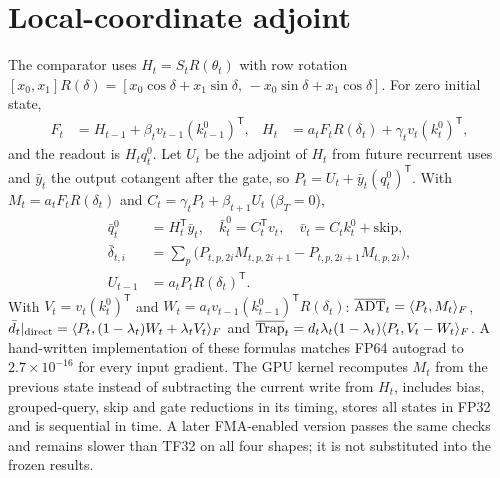 \appendices
\section{Local-coordinate adjoint}\label{app:local}
The comparator uses $H_t=S_tR(\theta_t)$ with row rotation $[x_0,x_1]R(\delta)=[x_0\cos\delta+x_1\sin\delta,\,-x_0\sin\delta+x_1\cos\delta]$. For zero initial state,
\begin{align}
F_t&=H_{t-1}+\beta_t v_{t-1}(k_{t-1}^{0})^{\mathsf T}, &
H_t&=a_tF_tR(\delta_t)+\gamma_t v_t(k_t^0)^{\mathsf T},\label{eq:local}
\end{align}
and the readout is $H_tq_t^0$. Let $U_t$ be the adjoint of $H_t$ from future recurrent uses and $\bar y_t$ the output cotangent after the gate, so $P_t=U_t+\bar y_t(q_t^0)^{\mathsf T}$. With $M_t=a_tF_tR(\delta_t)$ and $C_t=\gamma_tP_t+\beta_{t+1}U_t$ ($\beta_T=0$),
\begin{align}
\bar q_t^0&=H_t^{\mathsf T}\bar y_t,\quad\bar k_t^0=C_t^{\mathsf T}v_t,\quad\bar v_t=C_tk_t^0+\text{skip},\nonumber\\
\bar\delta_{t,i}&=\textstyle\sum_p\big(P_{t,p,2i}M_{t,p,2i+1}-P_{t,p,2i+1}M_{t,p,2i}\big),\nonumber\\
U_{t-1}&=a_tP_tR(\delta_t)^{\mathsf T}.\label{eq:localreverse}
\end{align}
With $V_t=v_t(k_t^0)^{\mathsf T}$ and $W_t=a_tv_{t-1}(k_{t-1}^0)^{\mathsf T}R(\delta_t)$: $\overline{\mathrm{ADT}}_t=\langle P_t,M_t\rangle_F$, $\bar d_t|_{\rm direct}=\langle P_t,(1-\lambda_t)W_t+\lambda_tV_t\rangle_F$ and $\overline{\mathrm{Trap}}_t=d_t\lambda_t(1-\lambda_t)\langle P_t,V_t-W_t\rangle_F$. A hand-written implementation of these formulas matches FP64 autograd to $2.7\times10^{-16}$ for every input gradient. The GPU kernel recomputes $M_t$ from the previous state instead of subtracting the current write from $H_t$, includes bias, grouped-query, skip and gate reductions in its timing, stores all states in FP32 and is sequential in time. A later FMA-enabled version passes the same checks and remains slower than TF32 on all four shapes; it is not substituted into the frozen results.

